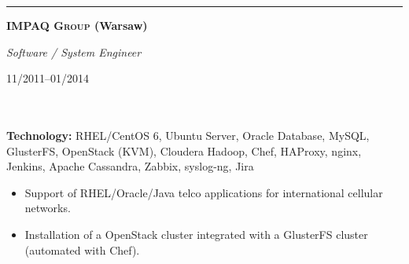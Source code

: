 \documentclass[$fontsize$, a4paper]{article}
\newcommand\textbox[1]{%
  \parbox{.333\textwidth}{#1}%
}
\newcommand{\note}[1]{\marginnote{\scriptsize #1}}
\begin{document}
\noindent\rule[0.5ex]{\linewidth}{1pt}

\noindent\textbox{\textbf{\textsc{IMPAQ Group} (Warsaw)}\hfill}\textbox{\hfil \emph{Software / System Engineer}\hfil}\textbox{\hfill 11/2011--01/2014}\\\\
\textbf{Technology:} RHEL/CentOS 6, Ubuntu Server, Oracle Database, MySQL, GlusterFS, OpenStack (KVM), Cloudera Hadoop, Chef, HAProxy, nginx, Jenkins, Apache Cassandra, Zabbix, syslog-ng, Jira

\vspace{10pt}
\begin{itemize}
  \item Support of RHEL/Oracle/Java telco applications for international cellular networks.
  \item Installation of a OpenStack cluster integrated with a GlusterFS cluster (automated with Chef).
\end{itemize}






\end{document}
